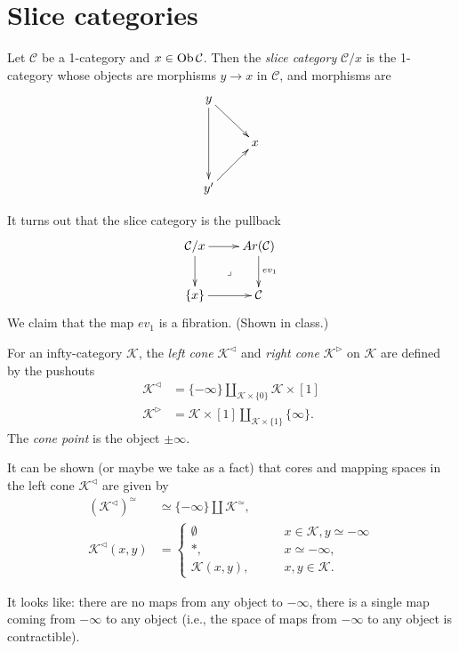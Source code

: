 \section{Slice categories}
\label{section-slice}

Let $\mathcal{C}$ be a 1-category and $x \in
\mathop{\mathrm{Ob}}\nolimits \mathcal{C}$.
Then the {\it slice category} $\mathcal{C}/x$
is the 1-category whose objects are morphisms
$y \to x$ in $\mathcal{C}$, and morphisms are
$$
\xymatrix{
y\ar[dd]\ar[dr]\\
& x\\
y'\ar[ur]
}
$$

It turns out that the slice category is the
pullback
$$
\xymatrix{
\mathcal{C}/x\ar[r]\ar[d]\ar@{}[dr]|-
{\lrcorner}&Ar(\mathcal{C})\ar[d]^{ev_1}\\
\{x\}\ar[r]&\mathcal{C}
}
$$
We claim that the map $ev_1$ is a fibration.
(Shown in class.)

\begin{definition}
\label{definition-cone}
For an infty-category $\mathcal{K}$,
the {\it left cone}
$\mathcal{K}^{\triangleleft}$
and {\it right cone}
$\mathcal{K}^{\triangleright}$ on
$\mathcal{K}$
are defined by the pushouts
$$
\begin{aligned}
\mathcal{K}^{\triangleleft}&
=\{-\infty\}\amalg_{\mathcal{K}\times\{0\}}
\mathcal{K}\times[1]\\
\mathcal{K}^{\triangleright}&
=\mathcal{K}\times[1]\amalg_{\mathcal{K}
\times\{1\}}\{\infty\}.
\end{aligned}
$$
The {\it cone point} is the object $\pm
\infty$.
\end{definition}

It can be shown (or maybe we take as a fact)
that cores and mapping spaces in the left
cone $\mathcal{K}^{\triangleleft}$
are given by
\begin{align*}
(\mathcal{K}^{\triangleleft})^\simeq&
\simeq \{-\infty\}\amalg\mathcal{K}^\simeq,\\
\mathcal{K}^{\triangleleft}(x,y)&=
\begin{cases}
\emptyset\qquad &x \in \mathcal{K}, y \simeq
-\infty \\
\ast,\qquad &x \simeq -\infty,\\
\mathcal{K}(x,y),\qquad &x,y \in \mathcal{K}.
\end{cases}
\end{align*}

\noindent
It looks like: there are no maps from any
object to $-\infty$,
there is a single map coming from $-\infty$
to any object
(i.e., the space of maps from $-\infty$ to
any object is contractible).

